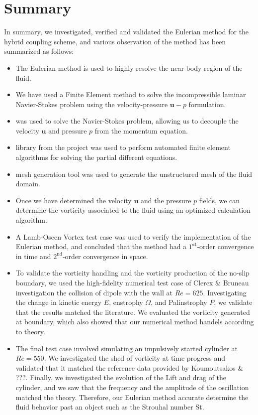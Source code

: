 \section{Summary}

In summary, we investigated, verified and validated the Eulerian method for the hybrid coupling scheme, and various observation of the method has been summarized as follows:

	\begin{itemize}
	\item The Eulerian method is used to highly resolve the near-body region of the fluid.
	\item We have used a Finite Element method to solve the incompressible laminar Navier-Stokes problem using the velocity-pressure $\mathbf{u}-p$ formulation.
	\item {} was used to solve the Navier-Stokes problem, allowing us to decouple the velocity $\mathbf{u}$ and pressure $p$ from the momentum equation.
	\item \dolfin library from the \fenics project was used to perform automated finite element algorithms for solving the partial different equations.
	\item \gmsh mesh generation tool was used to generate the unstructured mesh of the fluid domain.
	\item Once we have determined the velocity $\mathbf{u}$ and the pressure $p$ fields, we can determine the vorticity associated to the fluid using an optimized calculation algorithm.
	\item A Lamb-Oseen Vortex test case was used to verify the implementation of the Eulerian method, and concluded that the method had a $1^{\mathbf{st}}$-order convergence in time and $2^{\mathrm{nd}}$-order convergence in space.
	\item To validate the vorticity handling and the vorticity production of the no-slip boundary, we used the high-fidelity numerical test case of Clercx \& Bruneau investigation the collision of dipole with the wall at $Re=625$. Investigating the change in kinetic energy $E$, enstrophy $\Omega$, and Palinstrophy $P$, we validate that the results matched the literature. We evaluated the vorticity generated at boundary, which also showed that our numerical method handels according to theory.
	\item The final test case involved simulating an impulsively started cylinder at $Re=550$. We investigated the shed of vorticity at time progress and validated that it matched the reference data provided by Koumoutsakos \& ???. Finally, we investigated the evolution of the Lift and drag of the cylinder, and we saw that the frequency and the amplitude of the oscillation matched the theory. Therefore, our Eulerian method accurate determine the fluid behavior past an object such as the Strouhal number St.
	\end{itemize}

